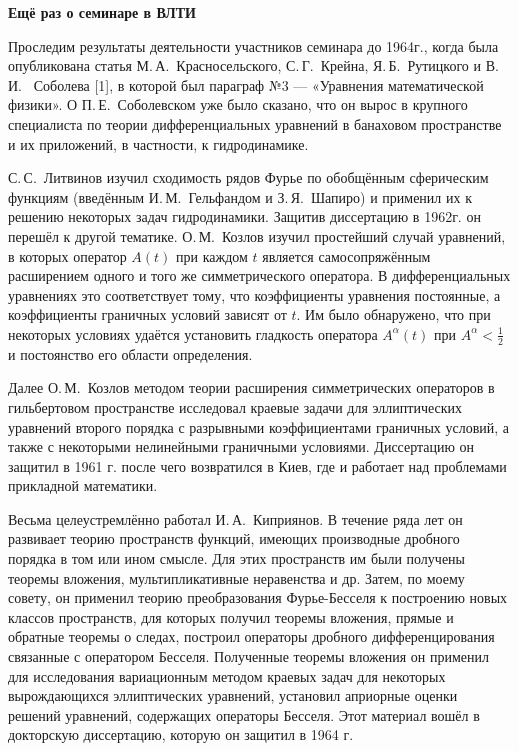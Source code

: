{\bf Ещё раз о семинаре в ВЛТИ}

Проследим результаты деятельности участников семинара до 1964г., когда была опубликована статья М.\,А.~Красносельского, С.\,Г.~Крейна, Я.\,Б.~Рутицкого и В.\,И.~ Соболева [1], в которой был параграф №3 --- «Уравнения математической физики». О П.\,Е.~Соболевском уже было сказано, что он вырос в крупного
специалиста по теории дифференциальных уравнений в банаховом пространстве и их приложений, в частности, к гидродинамике.

С.\,С.~Литвинов изучил сходимость рядов Фурье по обобщённым сферическим функциям
(введённым И.\,М.~Гель\-фа\-н\-дом и З.\,Я.~Шапиро) и применил их к решению некоторых задач гидродинамики. Защитив диссертацию в 1962г. он перешёл к другой тематике. О.\,М.~Козлов изучил простейший случай уравнений, в которых оператор $A(t)$ при каждом $t$ является самосопряжённым расширением одного и того же симметрического оператора. В дифференциальных уравнениях это соответствует тому, что коэффициенты уравнения постоянные, а коэффициенты граничных условий зависят от $t$. Им было обнаружено, что при некоторых условиях удаётся установить гладкость оператора $A^{\alpha}(t)$ при $A^{\alpha} < \frac{1}{2}$  и постоянство его области определения.

Далее О.\,М.~Козлов методом теории расширения симметрических операторов в гильбертовом пространстве исследовал краевые задачи для эллиптических уравнений второго порядка с разрывными коэффициентами граничных условий, а также с некоторыми нелинейными граничными условиями. Диссертацию он защитил в 1961 г. после чего возвратился в Киев, где и работает над проблемами прикладной математики.

Весьма целеустремлённо работал И.\,А.~Киприянов. В течение ряда лет он развивает теорию пространств функций, имеющих производные дробного порядка в том или ином смысле. Для этих пространств им были получены теоремы вложения, мультипликативные неравенства и др. Затем, по моему совету, он применил теорию преобразования
Фурье-Бесселя к построению новых классов пространств, для которых получил теоремы вложения, прямые и обратные теоремы о следах, построил операторы дробного дифференцирования связанные с оператором Бесселя. Полученные теоремы вложения он применил для исследования вариационным методом краевых задач для некоторых вырождающихся эллиптических уравнений, установил априорные оценки решений уравнений, содержащих операторы Бесселя. Этот материал вошёл в докторскую диссертацию, которую он защитил в 1964 г.

